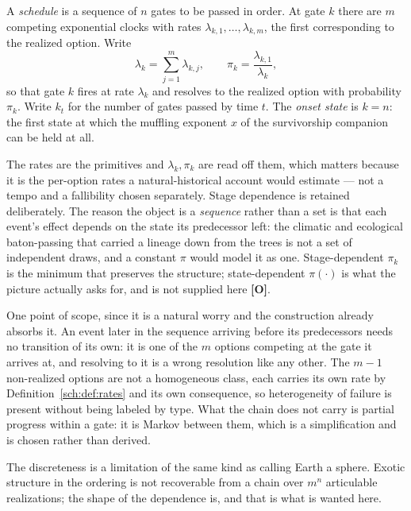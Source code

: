 \begin{definition}\label{sch:def:schedule}
A \emph{schedule} is a sequence of $n$ gates to be passed in order. At
gate $k$ there are $m$ competing exponential clocks with rates
$\lambda_{k,1},\dots,\lambda_{k,m}$, the first corresponding to the
realized option. Write
\begin{equation}\label{sch:eq:clocks}
\lambda_k=\sum_{j=1}^{m}\lambda_{k,j},
\qquad
\pi_k=\frac{\lambda_{k,1}}{\lambda_k},
\end{equation}
so that gate $k$ fires at rate $\lambda_k$ and resolves to the realized
option with probability $\pi_k$. Write $k_t$ for the number of gates
passed by time $t$. The \emph{onset state} is $k=n$: the first state at
which the muffling exponent $x$ of the survivorship companion \cite{GoldenSurvivorship} can be held at all.
\end{definition}

The rates are the primitives and $\lambda_k,\pi_k$ are read off them,
which matters because it is the per-option rates a natural-historical
account would estimate --- not a tempo and a fallibility chosen
separately. Stage dependence is retained deliberately. The reason the object is a
\emph{sequence} rather than a set is that each event's effect depends on
the state its predecessor left: the climatic and ecological
baton-passing that carried a lineage down from the trees is not a set of
independent draws, and a constant $\pi$ would model it as one.
Stage-dependent $\pi_k$ is the minimum that preserves the structure;
state-dependent $\pi(\cdot)$ is what the picture actually asks for, and
is not supplied here \textbf{[O]}.

One point of scope, since it is a natural worry and the construction
already absorbs it. An event later in the sequence arriving before its
predecessors needs no transition of its own: it is one of the $m$
options competing at the gate it arrives at, and resolving to it is a
wrong resolution like any other. The $m-1$ non-realized options are not
a homogeneous class, each carries its own rate by
Definition~\ref{sch:def:rates} and its own consequence, so
heterogeneity of failure is present without being labeled by type. What
the chain does not carry is partial progress within a gate: it is Markov
between them, which is a simplification and is chosen rather than
derived.

The discreteness is a limitation of the same kind as calling Earth a
sphere. Exotic structure in the ordering is not recoverable from a chain
over $m^n$ articulable realizations; the shape of the dependence is, and
that is what is wanted here.

